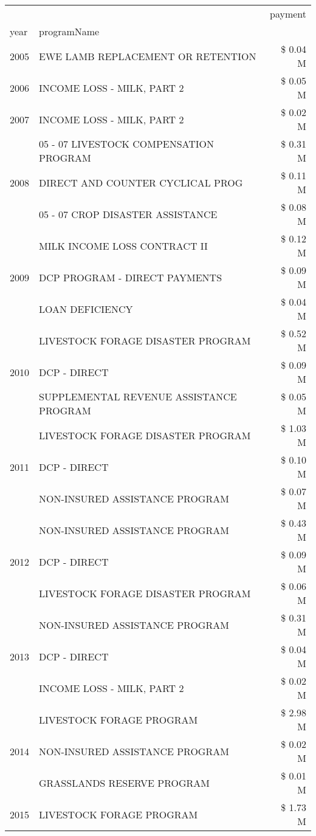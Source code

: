 \begin{tabular}{llr}
\toprule
 &  & payment \\
year & programName &  \\
\midrule
2005 & EWE LAMB REPLACEMENT OR RETENTION & \$ 0.04 M \\
\cline{1-3}
2006 & INCOME LOSS - MILK, PART 2 & \$ 0.05 M \\
\cline{1-3}
2007 & INCOME LOSS - MILK, PART 2 & \$ 0.02 M \\
\cline{1-3}
\multirow[t]{3}{*}{2008} & 05 - 07 LIVESTOCK COMPENSATION PROGRAM & \$ 0.31 M \\
 & DIRECT AND COUNTER CYCLICAL PROG & \$ 0.11 M \\
 & 05 - 07 CROP DISASTER ASSISTANCE & \$ 0.08 M \\
\cline{1-3}
\multirow[t]{3}{*}{2009} & MILK INCOME LOSS CONTRACT II & \$ 0.12 M \\
 & DCP PROGRAM - DIRECT PAYMENTS & \$ 0.09 M \\
 & LOAN DEFICIENCY & \$ 0.04 M \\
\cline{1-3}
\multirow[t]{3}{*}{2010} & LIVESTOCK FORAGE DISASTER PROGRAM & \$ 0.52 M \\
 & DCP - DIRECT & \$ 0.09 M \\
 & SUPPLEMENTAL REVENUE ASSISTANCE PROGRAM & \$ 0.05 M \\
\cline{1-3}
\multirow[t]{3}{*}{2011} & LIVESTOCK FORAGE DISASTER PROGRAM & \$ 1.03 M \\
 & DCP - DIRECT & \$ 0.10 M \\
 & NON-INSURED ASSISTANCE PROGRAM & \$ 0.07 M \\
\cline{1-3}
\multirow[t]{3}{*}{2012} & NON-INSURED ASSISTANCE PROGRAM & \$ 0.43 M \\
 & DCP - DIRECT & \$ 0.09 M \\
 & LIVESTOCK FORAGE DISASTER PROGRAM & \$ 0.06 M \\
\cline{1-3}
\multirow[t]{3}{*}{2013} & NON-INSURED ASSISTANCE PROGRAM & \$ 0.31 M \\
 & DCP - DIRECT & \$ 0.04 M \\
 & INCOME LOSS - MILK, PART 2 & \$ 0.02 M \\
\cline{1-3}
\multirow[t]{3}{*}{2014} & LIVESTOCK FORAGE PROGRAM & \$ 2.98 M \\
 & NON-INSURED ASSISTANCE PROGRAM & \$ 0.02 M \\
 & GRASSLANDS RESERVE PROGRAM & \$ 0.01 M \\
\cline{1-3}
\multirow[t]{3}{*}{2015} & LIVESTOCK FORAGE PROGRAM & \$ 1.73 M \\

\end{tabular}
